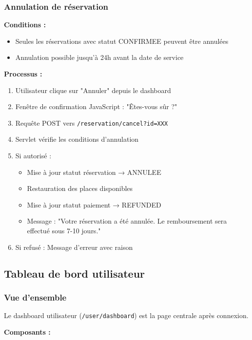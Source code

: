 \documentclass[12pt,a4paper]{report}
\begin{document}
\subsubsection{Annulation de réservation}

\textbf{Conditions :}
\begin{itemize}
    \item Seules les réservations avec statut CONFIRMEE peuvent être annulées
    \item Annulation possible jusqu'à 24h avant la date de service
\end{itemize}

\textbf{Processus :}
\begin{enumerate}
    \item Utilisateur clique sur "Annuler" depuis le dashboard
    \item Fenêtre de confirmation JavaScript : "Êtes-vous sûr ?"
    \item Requête POST vers \texttt{/reservation/cancel?id=XXX}
    \item Servlet vérifie les conditions d'annulation
    \item Si autorisé :
    \begin{itemize}
        \item Mise à jour statut réservation → ANNULEE
        \item Restauration des places disponibles
        \item Mise à jour statut paiement → REFUNDED
        \item Message : "Votre réservation a été annulée. Le remboursement sera effectué sous 7-10 jours."
    \end{itemize}
    \item Si refusé : Message d'erreur avec raison
\end{enumerate}

\subsection{Tableau de bord utilisateur}

\subsubsection{Vue d'ensemble}

Le dashboard utilisateur (\texttt{/user/dashboard}) est la page centrale après connexion.

\textbf{Composants :}
\end{document}
